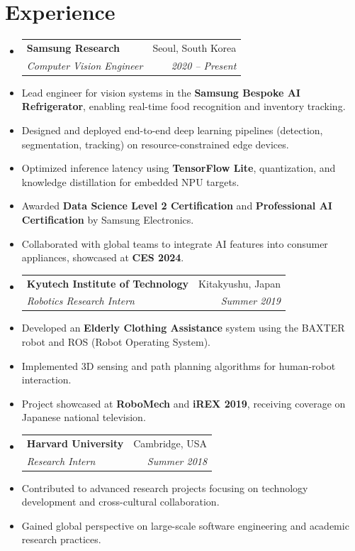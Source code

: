 \documentclass[a4paper,10pt]{article}
\makeatletter
\newcommand{\resumeItem}[1]{
  \item\small{#1 \vspace{-2pt}}
}
\newcommand{\resumeSubheading}[4]{
  \vspace{-1pt}\item
    \begin{tabular*}{0.97\textwidth}[t]{l@{\extracolsep{\fill}}r}
      \textbf{#1} & #2 \\
      \textit{\small#3} & \textit{\small #4} \\
    \end{tabular*}\vspace{-5pt}
}
\makeatother
\begin{document}
\section{Experience}
  \begin{itemize}[leftmargin=0.15in, label={}]
  
    \resumeSubheading
      {Samsung Research}{Seoul, South Korea}
      {Computer Vision Engineer}{2020 -- Present}
      \resumeItem{Lead engineer for vision systems in the \textbf{Samsung Bespoke AI Refrigerator}, enabling real-time food recognition and inventory tracking.}
      \resumeItem{Designed and deployed end-to-end deep learning pipelines (detection, segmentation, tracking) on resource-constrained edge devices.}
      \resumeItem{Optimized inference latency using \textbf{TensorFlow Lite}, quantization, and knowledge distillation for embedded NPU targets.}
      \resumeItem{Awarded \textbf{Data Science Level 2 Certification} and \textbf{Professional AI Certification} by Samsung Electronics.}
      \resumeItem{Collaborated with global teams to integrate AI features into consumer appliances, showcased at \textbf{CES 2024}.}

    \resumeSubheading
      {Kyutech Institute of Technology}{Kitakyushu, Japan}
      {Robotics Research Intern}{Summer 2019}
      \resumeItem{Developed an \textbf{Elderly Clothing Assistance} system using the BAXTER robot and ROS (Robot Operating System).}
      \resumeItem{Implemented 3D sensing and path planning algorithms for human-robot interaction.}
      \resumeItem{Project showcased at \textbf{RoboMech} and \textbf{iREX 2019}, receiving coverage on Japanese national television.}

    \resumeSubheading
      {Harvard University}{Cambridge, USA}
      {Research Intern}{Summer 2018}
      \resumeItem{Contributed to advanced research projects focusing on technology development and cross-cultural collaboration.}
      \resumeItem{Gained global perspective on large-scale software engineering and academic research practices.}

  \end{itemize}


\end{document}

